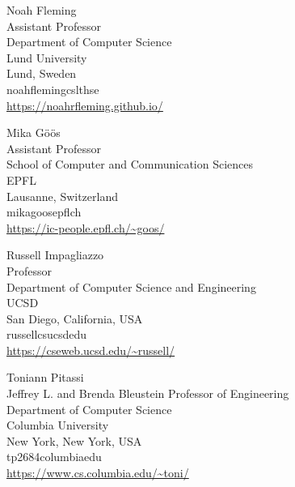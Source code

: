 \documentclass{toc}
\begin{document}
 




%
%
%


%
%
%
%
%
\begin{tocauthors}
\begin{tocinfo}[fleming]
 Noah Fleming\\
 Assistant Professor\\               %
 Department of Computer Science\\
 Lund University\\
 Lund, Sweden\\
 noah\tocdot{}fleming\tocat{}cs\tocdot{}lth\tocdot{}se \\   %
 \url{https://noahrfleming.github.io/}      %
\end{tocinfo}
\begin{tocinfo}[goos]
  Mika G\"o\"os\\                  %
  Assistant Professor\\
  School of Computer and Communication Sciences\\
  EPFL\\
  Lausanne, Switzerland\\
  mika\tocdot{}goos\tocat{}epfl\tocdot{}ch \\
  \url{https://ic-people.epfl.ch/~goos/}
\end{tocinfo}
\begin{tocinfo}[impagliazzo]
 Russell Impagliazzo\\
 Professor\\
 Department of Computer Science and Engineering \\
 UCSD\\
 San Diego, California, USA\\
 russell\tocat{}cs\tocdot{}ucsd\tocdot{}edu \\   %
 \url{https://cseweb.ucsd.edu/~russell/}      %
\end{tocinfo}
\begin{tocinfo}[pitassi]
 Toniann Pitassi\\
 Jeffrey L. and Brenda Bleustein Professor of Engineering\\
 Department of Computer Science\\
 Columbia University\\
 New York, New York, USA\\
 tp2684\tocat{}columbia\tocdot{}edu \\   %
 \url{https://www.cs.columbia.edu/~toni/}      %

\end{tocinfo}
\end{tocauthors}
\end{document}
